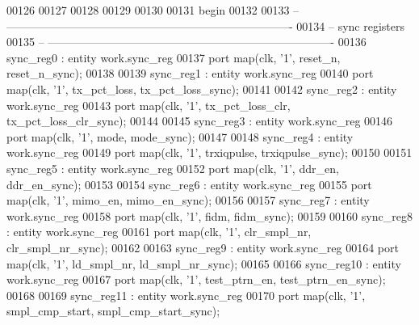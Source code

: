 \begin{DoxyCode}
00126 
00127 
00128 
00129 
00130 
00131 \textcolor{vhdlkeyword}{begin}
00132 
00133 \textcolor{keyword}{-- ----------------------------------------------------------------------------}
00134 \textcolor{keyword}{-- sync registers}
00135 \textcolor{keyword}{-- ----------------------------------------------------------------------------}
00136 sync\_reg0 : \textcolor{keywordflow}{entity} work.sync_reg 
00137 \textcolor{keywordflow}{port} \textcolor{keywordflow}{map}(clk, '1', reset_n, reset_n_sync\textcolor{vhdlchar}{)};
00138  
00139 sync\_reg1 : \textcolor{keywordflow}{entity} work.sync_reg 
00140 \textcolor{keywordflow}{port} \textcolor{keywordflow}{map}(clk, '1', tx_pct_loss, tx_pct_loss_sync\textcolor{vhdlchar}{)};
00141  
00142 sync\_reg2 : \textcolor{keywordflow}{entity} work.sync_reg 
00143 \textcolor{keywordflow}{port} \textcolor{keywordflow}{map}(clk, '1', tx_pct_loss_clr, tx_pct_loss_clr_sync\textcolor{vhdlchar}{)};
00144 
00145 sync\_reg3 : \textcolor{keywordflow}{entity} work.sync_reg 
00146 \textcolor{keywordflow}{port} \textcolor{keywordflow}{map}(clk, '1', mode, mode_sync\textcolor{vhdlchar}{)};
00147 
00148 sync\_reg4 : \textcolor{keywordflow}{entity} work.sync_reg 
00149 \textcolor{keywordflow}{port} \textcolor{keywordflow}{map}(clk, '1', trxiqpulse, trxiqpulse_sync\textcolor{vhdlchar}{)};
00150 
00151 sync\_reg5 : \textcolor{keywordflow}{entity} work.sync_reg 
00152 \textcolor{keywordflow}{port} \textcolor{keywordflow}{map}(clk, '1', ddr_en, ddr_en_sync\textcolor{vhdlchar}{)};
00153 
00154 sync\_reg6 : \textcolor{keywordflow}{entity} work.sync_reg 
00155 \textcolor{keywordflow}{port} \textcolor{keywordflow}{map}(clk, '1', mimo_en, mimo_en_sync\textcolor{vhdlchar}{)};
00156 
00157 sync\_reg7 : \textcolor{keywordflow}{entity} work.sync_reg 
00158 \textcolor{keywordflow}{port} \textcolor{keywordflow}{map}(clk, '1', fidm, fidm_sync\textcolor{vhdlchar}{)};
00159 
00160 sync\_reg8 : \textcolor{keywordflow}{entity} work.sync_reg 
00161 \textcolor{keywordflow}{port} \textcolor{keywordflow}{map}(clk, '1', clr_smpl_nr, clr_smpl_nr_sync\textcolor{vhdlchar}{)};
00162 
00163 sync\_reg9 : \textcolor{keywordflow}{entity} work.sync_reg 
00164 \textcolor{keywordflow}{port} \textcolor{keywordflow}{map}(clk, '1', ld_smpl_nr, ld_smpl_nr_sync\textcolor{vhdlchar}{)};
00165 
00166 sync\_reg10 : \textcolor{keywordflow}{entity} work.sync_reg 
00167 \textcolor{keywordflow}{port} \textcolor{keywordflow}{map}(clk, '1', test_ptrn_en, test_ptrn_en_sync\textcolor{vhdlchar}{)};
00168 
00169 sync\_reg11 : \textcolor{keywordflow}{entity} work.sync_reg 
00170 \textcolor{keywordflow}{port} \textcolor{keywordflow}{map}(clk, '1', smpl_cmp_start, smpl_cmp_start_sync\textcolor{vhdlchar}{)};

\end{DoxyCode}
